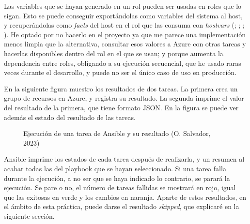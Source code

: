 \documentclass[11pt]{article}
\begin{document}
\begin{flushleft}
    Las variables que se hayan generado en un rol pueden ser usadas en roles que lo sigan. Esto se puede conseguir exportándolas como variables del sistema al host, y recuperándolas como \textit{facts} del host en el rol que las consuma con \textit{hostvars} (\cite{ansible_facts1}; \cite{ansible_facts2}; \cite{ansible_facts3}; \cite{ansible_facts4}). He optado por no hacerlo en el proyecto ya que me parece una implementación menos limpia que la alternativa, consultar esos valores a Azure con otras tareas y hacerlas disponibles dentro del rol en el que se usan; y porque aumenta la dependencia entre roles, obligando a su ejecución secuencial, que he usado raras veces durante el desarrollo, y puede no ser el único caso de uso en producción.
    \linebreak

    En la siguiente figura muestro los resultados de dos tareas. La primera crea un grupo de recursos en Azure, y registra su resultado. La segunda imprime el valor del resultado de la primera, que tiene formato JSON. En la figura se puede ver además el estado del resultado de las tareas.
    \linebreak

        \skip
        \begin{figure}[htb]
			\centering
			\caption{Ejecución de una tarea de Ansible y su resultado (O. Salvador, 2023)}
            \label{resultado_resource_group}
		\end{figure}
        \skip
        
    Ansible imprime los estados de cada tarea después de realizarla, y un resumen al acabar todas las del playbook que se hayan seleccionado. Si una tarea falla durante la ejecución, a no ser que se haya indicado lo contrario, se parará la ejecución. Se pare o no, el número de tareas fallidas se mostrará en rojo, igual que las exitosas en verde y los cambios en naranja. Aparte de estos resultados, en el ámbito de esta práctica, puede darse el resultado \textit{skipped}, que explicaré en la siguiente sección.
    \linebreak


\end{flushleft}
\end{document}
